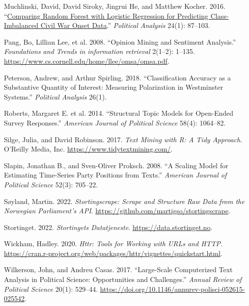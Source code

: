 \documentclass[
]{article}
\newlength{\cslhangindent}
\newlength{\cslentryspacingunit} %
\newenvironment{CSLReferences}[2] %
 {%
  \setlength{\parindent}{0pt}
  \ifodd #1
  \let\oldpar\par
  \def\par{\hangindent=\cslhangindent\oldpar}
  \fi
  \setlength{\parskip}{#2\cslentryspacingunit}
 }%
 {}
\begin{document}
\begin{CSLReferences}{1}{0}
\leavevmode{}%
Muchlinski, David, David Siroky, Jingrui He, and Matthew Kocher. 2016.
{``\href{https://doi.org/10.1093/pan/mpv024}{Comparing Random Forest
with Logistic Regression for Predicting Class-Imbalanced Civil War Onset
Data}.''} \emph{Political Analysis} 24(1): 87--103.

\leavevmode{}%
Pang, Bo, Lillian Lee, et al. 2008. {``Opinion Mining and Sentiment
Analysis.''} \emph{Foundations and Trends{\textregistered} in
information retrieval} 2(1--2): 1--135.
\url{https://www.cs.cornell.edu/home/llee/omsa/omsa.pdf}.

\leavevmode{}%
Peterson, Andrew, and Arthur Spirling. 2018. {``{C}lassification
{A}ccuracy as a {S}ubstantive {Q}uantity of {I}nterest: {M}easuring
{P}olarization in {W}estminster {S}ystems.''} \emph{Political Analysis}
26(1).

\leavevmode{}%
Roberts, Margaret E. et al. 2014. {``{S}tructural {T}opic {M}odels for
{O}pen-{E}nded {S}urvey {R}esponses.''} \emph{American Journal of
Political Science} 58(4): 1064--82.

\leavevmode{}%
Silge, Julia, and David Robinson. 2017. \emph{Text Mining with {R}: A
Tidy Approach}. O'Reilly Media, Inc.
\url{https://www.tidytextmining.com/}.

\leavevmode{}%
Slapin, Jonathan B., and Sven-Oliver Proksch. 2008. {``{A} {S}caling
{M}odel for {E}stimating {T}ime-{S}eries {P}arty {P}ositions from
{T}exts.''} \emph{American Journal of Political Science} 52(3): 705--22.

\leavevmode{}%
Søyland, Martin. 2022. \emph{Stortingscrape: {S}crape and Structure Raw
Data from the {N}orwegian Parliament's API}.
\url{https://github.com/martigso/stortingscrape}.

\leavevmode{}%
Stortinget. 2022. \emph{Stortingets Datatjeneste}.
\url{https://data.stortinget.no}.

\leavevmode{}%
Wickham, Hadley. 2020. \emph{Httr: Tools for Working with URLs and
HTTP}.
\url{https://cran.r-project.org/web/packages/httr/vignettes/quickstart.html}.

\leavevmode{}%
Wilkerson, John, and Andreu Casas. 2017. {``Large-Scale Computerized
Text Analysis in Political Science: Opportunities and Challenges.''}
\emph{Annual Review of Political Science} 20(1): 529--44.
\url{https://doi.org/10.1146/annurev-polisci-052615-025542}.

\end{CSLReferences}
\end{document}
